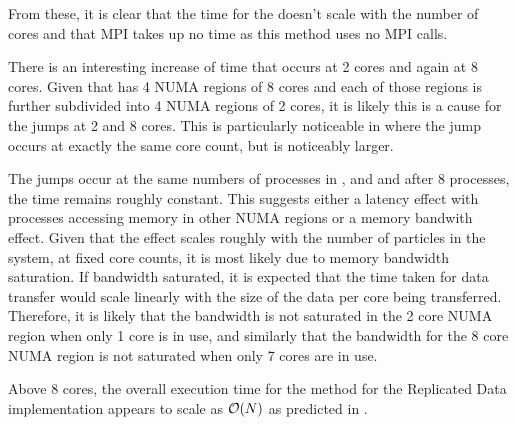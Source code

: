 \begin{figure}[!h]
    
    \caption{}
    \label{fig:v0_replicated_individual_operation_32768_time}
\end  {figure}


\vZeroTimeExplanation
    {  }
    {  }
    {  }
    { \individualoperation{} }


From these, it is clear that
the time for the \individualoperation{} doesn't scale with the number
of cores and that MPI takes up no time as this method uses no MPI calls.

There is an interesting increase of time that occurs at 2 cores and again
at 8 cores.
%
Given that \hector{} has 4 NUMA regions of 8 cores and each of those
regions is further subdivided into 4 NUMA regions of 2 cores,
it is likely this is a cause for the jumps at 2 and 8 cores.
%
This is particularly noticeable in
where the jump occurs at exactly the same core count, but is noticeably larger.

The jumps occur at the same numbers of processes in
,
 and
and after 8 processes, the time remains roughly constant.
%
This suggests either a latency effect with processes accessing memory
in other NUMA regions or a memory bandwith effect.
%
Given that the effect scales roughly with the number of particles
in the system, at fixed core counts, it is most likely due to
memory bandwidth saturation.
%
If bandwidth saturated, it is expected that the time taken for
data transfer would
scale linearly with the size of the data per core being transferred.
%
Therefore, it is likely that the bandwidth is not saturated in the 2 core NUMA
region when only 1 core is in use, and
similarly that the bandwidth for the 8 core NUMA region is not saturated
when only 7 cores are in use.

Above 8 cores, the overall execution time for
the \individualoperation{} method for the Replicated Data implementation
appears to scale as $\mathcal{O}{\left({ N }\right)}$
as predicted in .


